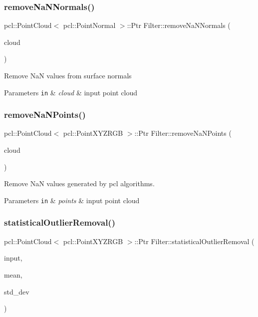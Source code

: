 \subsubsection{\texorpdfstring{remove\+Na\+N\+Normals()}{removeNaNNormals()}}
{\footnotesize\ttfamily pcl\+::\+Point\+Cloud$<$ pcl\+::\+Point\+Normal $>$\+::Ptr Filter\+::remove\+Na\+N\+Normals (\begin{DoxyParamCaption}\item[{const pcl\+::\+Point\+Cloud$<$ pcl\+::\+Point\+Normal $>$\+::Ptr \&}]{cloud }\end{DoxyParamCaption})}

Remove NaN values from surface normals 
\begin{DoxyParams}[1]{Parameters}
\mbox{\tt in}  & {\em cloud} & input point cloud \\
\hline
\end{DoxyParams}
\hypertarget{class_filter_aeb13a40d687d3ceec3c01510b49855ac}{}\label{class_filter_aeb13a40d687d3ceec3c01510b49855ac} 
\subsubsection{\texorpdfstring{remove\+Na\+N\+Points()}{removeNaNPoints()}}
{\footnotesize\ttfamily pcl\+::\+Point\+Cloud$<$ pcl\+::\+Point\+X\+Y\+Z\+R\+GB $>$\+::Ptr Filter\+::remove\+Na\+N\+Points (\begin{DoxyParamCaption}\item[{const pcl\+::\+Point\+Cloud$<$ pcl\+::\+Point\+X\+Y\+Z\+R\+GB $>$\+::Ptr \&}]{cloud }\end{DoxyParamCaption})}

Remove NaN values generated by pcl algorithms. 
\begin{DoxyParams}[1]{Parameters}
\mbox{\tt in}  & {\em points} & input point cloud \\
\hline
\end{DoxyParams}
\hypertarget{class_filter_ad73a60fc35775b86e962f7dcbfc1ef72}{}\label{class_filter_ad73a60fc35775b86e962f7dcbfc1ef72} 
\subsubsection{\texorpdfstring{statistical\+Outlier\+Removal()}{statisticalOutlierRemoval()}}
{\footnotesize\ttfamily pcl\+::\+Point\+Cloud$<$ pcl\+::\+Point\+X\+Y\+Z\+R\+GB $>$\+::Ptr Filter\+::statistical\+Outlier\+Removal (\begin{DoxyParamCaption}\item[{const pcl\+::\+Point\+Cloud$<$ pcl\+::\+Point\+X\+Y\+Z\+R\+GB $>$\+::Ptr \&}]{input,  }\item[{float}]{mean,  }\item[{float}]{std\+\_\+dev }\end{DoxyParamCaption})}

